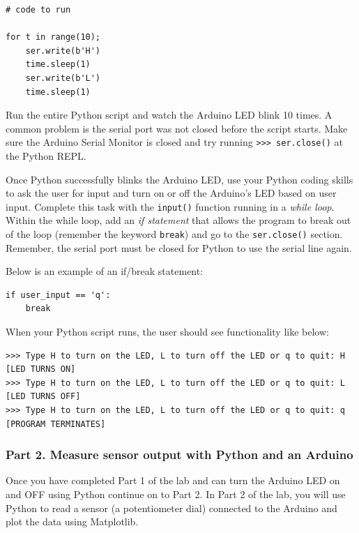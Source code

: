\begin{verbatim}
# code to run

for t in range(10);
    ser.write(b'H')
    time.sleep(1)
    ser.write(b'L')
    time.sleep(1)
\end{verbatim}

    Run the entire Python script and watch the Arduino LED blink 10 times. A
common problem is the serial port was not closed before the script
starts. Make sure the Arduino Serial Monitor is closed and try running
\texttt{\textgreater{}\textgreater{}\textgreater{}\ ser.close()} at the
Python REPL.

Once Python successfully blinks the Arduino LED, use your Python coding
skills to ask the user for input and turn on or off the Arduino's LED
based on user input. Complete this task with the \texttt{input()}
function running in a \textit{while loop}. Within the while loop, add an \textit{if
statement} that allows the program to break out of the loop (remember the
keyword \texttt{break}) and go to the \texttt{ser.close()} section. Remember, the
serial port must be closed for Python to use the serial line again.

Below is an example of an if/break statement:

\begin{verbatim}
if user_input == 'q':
    break 
\end{verbatim}

When your Python script runs, the user should see functionality like
below:

\begin{verbatim}
>>> Type H to turn on the LED, L to turn off the LED or q to quit: H
[LED TURNS ON]
>>> Type H to turn on the LED, L to turn off the LED or q to quit: L
[LED TURNS OFF]
>>> Type H to turn on the LED, L to turn off the LED or q to quit: q
[PROGRAM TERMINATES]
\end{verbatim}

    \hypertarget{part-2.-measure-sensor-output-with-python-and-an-arduino}{%
\subsubsection{Part 2. Measure sensor output with Python and an
Arduino}\label{part-2.-measure-sensor-output-with-python-and-an-arduino}}

Once you have completed Part 1 of the lab and can turn the Arduino LED
on and OFF using Python continue on to Part 2. In Part 2 of the lab, you
will use Python to read a sensor (a potentiometer dial) connected to the
Arduino and plot the data using Matplotlib.

